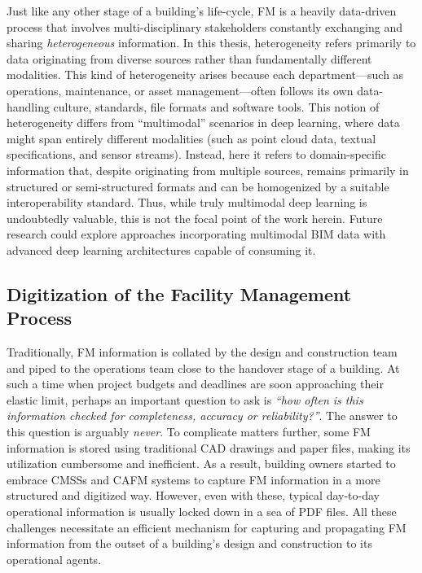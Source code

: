 Just like any other stage of a building's life-cycle, \ac{FM} is a heavily data-driven process that involves multi-disciplinary stakeholders constantly exchanging and sharing \textit{heterogeneous} information. In this thesis, heterogeneity refers primarily to data originating from diverse sources rather than fundamentally different modalities. This kind of heterogeneity arises because each department—such as operations, maintenance, or asset management—often follows its own data-handling culture, standards, file formats and software tools. This notion of heterogeneity differs from “multimodal” scenarios in deep learning, where data might span entirely different modalities (such as point cloud data, textual specifications, and sensor streams). Instead, here it refers to domain-specific information that, despite originating from multiple sources, remains primarily in structured or semi-structured formats and can be homogenized by a suitable interoperability standard. Thus, while truly multimodal deep learning is undoubtedly valuable, this is not the focal point of the work herein. Future research could explore approaches incorporating multimodal \ac{BIM} data with advanced deep learning architectures capable of consuming it.

\subsection{Digitization of the Facility Management Process}
\label{subsec:digitization of FM}
Traditionally, \ac{FM} information is collated by the design and construction team and piped to the operations team close to the handover stage of a building. At such a time when project budgets and deadlines are soon approaching their elastic limit, perhaps an important question to ask is \textit{“how often is this information checked for completeness, accuracy or reliability?”}. The answer to this question is arguably \textit{never}. To complicate matters further, some \ac{FM} information is stored using traditional \ac{CAD} drawings and paper files, making its utilization cumbersome and inefficient. As a result, building owners started to embrace \acp{CMSS} and \ac{CAFM} systems to capture \ac{FM} information in a more structured and digitized way. However, even with these, typical day-to-day operational information is usually locked down in a sea of \ac{PDF} files. All these challenges necessitate an efficient mechanism for capturing and propagating \ac{FM} information from the outset of a building’s design and construction to its operational agents.

